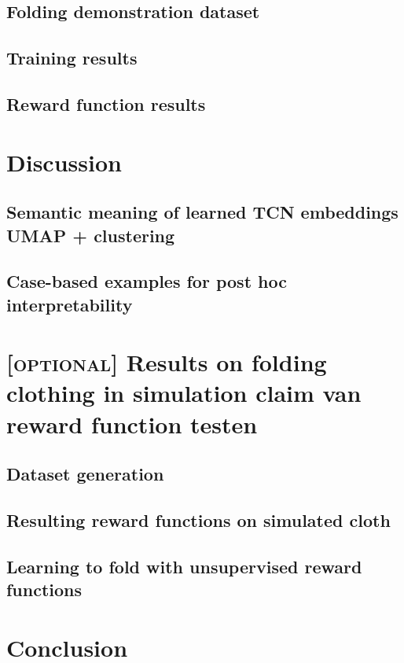 \documentclass[\home/main.tex]{subfiles}
\begin{document}
\subsection{Folding demonstration dataset}
\subsection{Training results}
\subsection{Reward function results}

\section{Discussion}
\subsection{Semantic meaning of learned TCN embeddings {\tiny UMAP + clustering}}
\subsection{Case-based examples for post hoc interpretability}

\section{\textsc{[optional]} Results on folding clothing in simulation {\tiny claim van reward function testen}}
\subsection{Dataset generation}
\subsection{Resulting reward functions on simulated cloth}
\subsection{Learning to fold with unsupervised reward functions}

\section{Conclusion}
\end{document}
